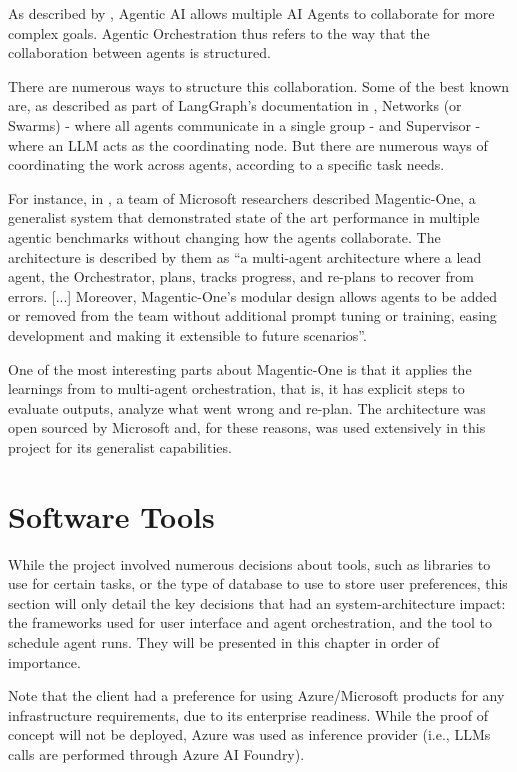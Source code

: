 \documentclass[a4paper]{report}
\begin{document}
As described by \cite{sapkota2025aiagentsvsagentic}, Agentic AI allows multiple AI Agents to collaborate for more complex goals. Agentic Orchestration thus refers to the way that the collaboration between agents is structured.

There are numerous ways to structure this collaboration. Some of the best known are, as described as part of LangGraph's documentation in \cite{langgraphagmultiagentsystems}, Networks (or Swarms) - where all agents communicate in a single group - and Supervisor - where an LLM acts as the coordinating node. But there are numerous ways of coordinating the work across agents, according to a specific task needs.

For instance, in \cite{fourney2024magenticone}, a team of Microsoft researchers described Magentic-One, a generalist system that demonstrated state of the art performance in multiple agentic benchmarks without changing how the agents collaborate. The architecture is described by them as ``a multi-agent architecture where a lead agent, the Orchestrator, plans, tracks progress, and re-plans to recover from errors. [...] Moreover, Magentic-One's modular design allows agents to be added or removed from the team without additional prompt tuning or training, easing development and making it extensible to future scenarios''.

One of the most interesting parts about Magentic-One is that it applies the learnings from \cite{shinn2023reflexion} to multi-agent orchestration, that is, it has explicit steps to evaluate  outputs, analyze what went wrong and re-plan. The architecture was open sourced by Microsoft and, for these reasons, was used extensively in this project for its generalist capabilities.

\section{Software Tools}
\label{sec:research-tools}

While the project involved numerous decisions about tools, such as libraries to use for certain tasks, or the type of database to use to store user preferences, this section will only detail the key decisions that had an system-architecture impact: the frameworks used for user interface and agent orchestration, and the tool to schedule agent runs. They will be presented in this chapter in order of importance.

Note that the client had a preference for using Azure/Microsoft products for any infrastructure requirements, due to its enterprise readiness. While the proof of concept will not be deployed, Azure was used as inference provider (i.e., LLMs calls are performed through Azure AI Foundry). 
\end{document}
